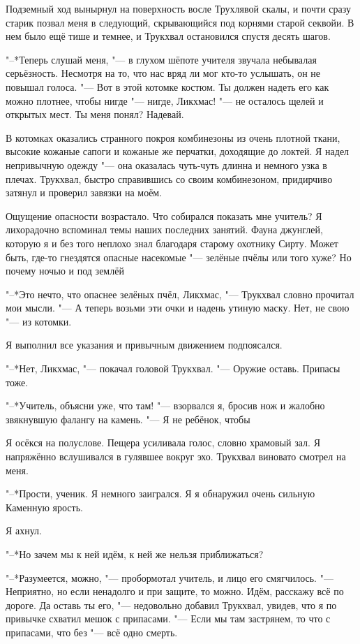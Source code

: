 \documentclass[a4paper,10pt,fleqn]{book}
\newcommand{\ldotst}{\so{...}\xspace}
\newcommand{\ldotsq}{\so{?\hbox{\hspace{-.212em}}..}\xspace}
\begin{document}
Подземный ход вынырнул на поверхность восле Трухлявой скалы, и почти сразу старик позвал меня в следующий, скрывающийся под корнями старой секвойи.
В нем было ещё тише и темнее, и Трукхвал остановился спустя десять шагов.

"--*Теперь слушай меня, "--- в глухом шёпоте учителя звучала небывалая серьёзность.
Несмотря на то, что нас вряд ли мог кто-то услышать, он не повышал голоса.
"--- Вот в этой котомке костюм.
Ты должен надеть его как можно плотнее, чтобы нигде "--- нигде, Ликхмас! "--- не осталось щелей и открытых мест.
Ты меня понял?
Надевай.

В котомках оказались странного покроя комбинезоны из очень плотной ткани, высокие кожаные сапоги и кожаные же перчатки, доходящие до локтей.
Я надел непривычную одежду "--- она оказалась чуть-чуть длинна и немного узка в плечах.
Трукхвал, быстро справившись со своим комбинезоном, придирчиво затянул и проверил завязки на моём.

Ощущение опасности возрастало.
Что собирался показать мне учитель?
Я лихорадочно вспоминал темы наших последних занятий.
Фауна джунглей, которую я и без того неплохо знал благодаря старому охотнику Сирту.
Может быть, где-то гнездятся опасные насекомые "--- зелёные пчёлы или того хуже?
Но почему ночью и под землёй\ldotsq

"--*Это нечто, что опаснее зелёных пчёл, Ликхмас, "--- Трукхвал словно прочитал мои мысли.
"--- А теперь возьми эти очки и надень утиную маску.
Нет, не свою "--- из котомки.

Я выполнил все указания и привычным движением подпоясался.

"--*Нет, Ликхмас, "--- покачал головой Трукхвал.
"--- Оружие оставь.
Припасы тоже.

"--*Учитель, объясни уже, что там! "--- взорвался я, бросив нож и жалобно звякнувшую фалангу на камень.
"--- Я не ребёнок, чтобы\ldotst

Я осёкся на полуслове.
Пещера усиливала голос, словно храмовый зал.
Я напряжённо вслушивался в гулявшее вокруг эхо.
Трукхвал виновато смотрел на меня.

"--*Прости, ученик.
Я немного заигрался.
Я\ldotst я обнаружил очень сильную Каменную ярость.

Я ахнул.

"--*Но зачем мы к ней идём, к ней же нельзя приближаться?

"--*Разумеется, можно, "--- пробормотал учитель, и лицо его смягчилось.
"--- Неприятно, но если ненадолго и при защите, то можно.
Идём, расскажу всё по дороге.
Да оставь ты его, "--- недовольно добавил Трукхвал, увидев, что я по привычке схватил мешок с припасами.
"--- Если мы там застрянем, то что с припасами, что без "--- всё одно смерть.
\end{document}

